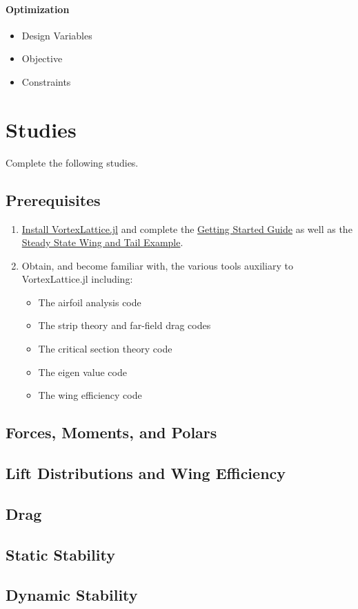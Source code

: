 \documentclass[11pt,twocolumn]{article}
\begin{document}
\paragraph{Optimization}
\begin{itemize}
	\item Design Variables
	\item Objective
	\item Constraints
\end{itemize}

\newpage

\section{Studies}
\label{sec:studies}

Complete the following studies.

\subsection{Prerequisites}
\label{ssec:prereqs}

\begin{enumerate}[label=\roman*.]
	\item \href{https://flow.byu.edu/VortexLattice.jl/stable/#Installation}{Install VortexLattice.jl} and complete the \href{https://flow.byu.edu/VortexLattice.jl/stable/guide/}{Getting Started Guide} as well as the \href{https://flow.byu.edu/VortexLattice.jl/stable/examples/#Steady-State-Analysis-of-a-Wing-and-Tail}{Steady State Wing and Tail Example}.
	\item Obtain, and become familiar with, the various tools auxiliary to VortexLattice.jl including:
	\begin{itemize}
		\item The airfoil analysis code
		\item The strip theory and far-field drag codes
		\item The critical section theory code
		\item The eigen value code
		\item The wing efficiency code
	\end{itemize}
\end{enumerate}

\subsection{Forces, Moments, and Polars}

\subsection{Lift Distributions and Wing Efficiency}

\subsection{Drag}

\subsection{Static Stability}

\subsection{Dynamic Stability}
\end{document}
